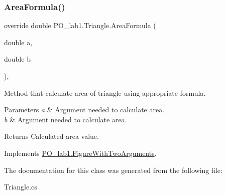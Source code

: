 \subsubsection{\texorpdfstring{Area\+Formula()}{AreaFormula()}}
{\footnotesize\ttfamily override double P\+O\+\_\+lab1.\+Triangle.\+Area\+Formula (\begin{DoxyParamCaption}\item[{double}]{a,  }\item[{double}]{b }\end{DoxyParamCaption})\hspace{0.3cm}{\ttfamily [inline]}, {\ttfamily [virtual]}}



Method that calculate area of triangle using appropriate formula. 


\begin{DoxyParams}{Parameters}
{\em a} & Argument needed to calculate area.\\
\hline
{\em b} & Argument needed to calculate area.\\
\hline
\end{DoxyParams}
\begin{DoxyReturn}{Returns}
Calculated area value.
\end{DoxyReturn}


Implements \mbox{\hyperlink{class_p_o__lab1_1_1_figure_with_two_arguments}{P\+O\+\_\+lab1.\+Figure\+With\+Two\+Arguments}}.



The documentation for this class was generated from the following file\+:\begin{DoxyCompactItemize}
\item 
Triangle.\+cs\end{DoxyCompactItemize}
